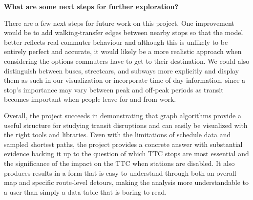 \documentclass[fontsize=11pt]{article}
\begin{document}
\vspace{1em}

\textbf{What are some next steps for further exploration?}

\vspace{1em}

There are a few next steps for future work on this project. One improvement would be to add walking-transfer edges between nearby stops so that the model better reflects real commuter behaviour and although this is unlikely to be entirely perfect and accurate, it would likely be a more realistic approach when considering the options commuters have to get to their destination. We could also distinguish between buses, streetcars, and subways more explicitly and display them as such in our visualization or incorporate time-of-day information, since a stop's importance may vary between peak and off-peak periods as transit becomes important when people leave for and from work.

\vspace{1em}

Overall, the project succeeds in demonstrating that graph algorithms provide a useful structure for studying transit disruptions and can easily be visualized with the right tools and libraries. Even with the limitations of schedule data and sampled shortest paths, the project provides a concrete answer with substantial evidence backing it up to the question of which TTC stops are most essential and the significance of the impact on the TTC when stations are disabled. It also produces results in a form that is easy to understand through both an overall map and specific route-level detours, making the analysis more understandable to a user than simply a data table that is boring to read.



\newpage
\end{document}
